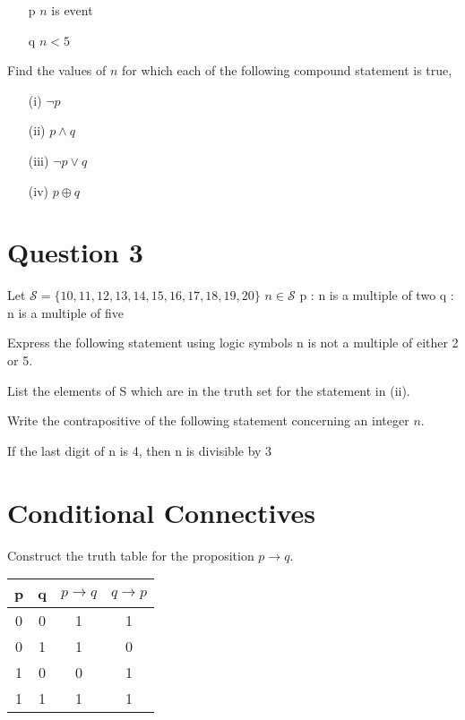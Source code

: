 \documentclass[]{report}
\begin{document}
\begin{itemize}
	\item[p] $n$ is event
	\item[q] $n<5$
\end{itemize}

Find the values of $n$ for which each of the following compound statement is true,

\begin{itemize}
	\item[(i)] $\neg p$
	\item[(ii)] $p \wedge q$
	\item[(iii)] $\neg p \vee q$ 
	\item[(iv)] $p \oplus q$
\end{itemize}

\section*{Question 3}

Let $\mathcal{S} = \{10,11,12,13,14,15,16,17,18,19,20\}$
$n  \in \mathcal{S}$
p : n is a multiple of two
q : n is a multiple of five

Express the following statement using logic symbols
n is not a multiple of either 2 or 5.

List the elements of S which are in the truth set for the statement in (ii).

Write the contrapositive of the following statement concerning an integer $n$.

If the last digit of n is 4, then n is divisible by 3

\section{Conditional Connectives}
Construct the truth table for the proposition $p \rightarrow q$.

\begin{center}
	\begin{tabular}{|c|c|c|c|}
		\hline
		p & q & $p \rightarrow q$ & $q \rightarrow p$ \\
		\hline
		0 & 0 & 1& 1 \\
		0 & 1 & 1 & 0 \\
		1 & 0 & 0 & 1 \\
		1 & 1 & 1 & 1 \\
		\hline
	\end{tabular}
\end{center}
\end{document}
